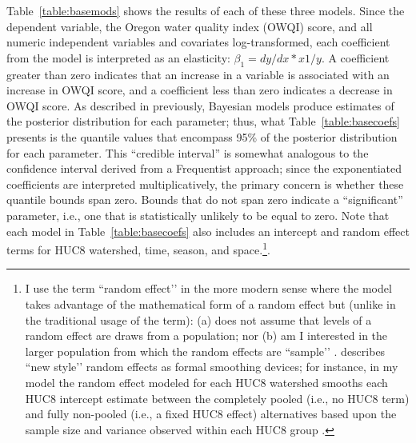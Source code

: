 \documentclass[12pt,a4paper,titlepage]{article}
\begin{document}
Table~\ref{table:basemods} shows the results of each of these three models. Since the dependent variable, the Oregon water quality index (OWQI) score, and all numeric independent variables and covariates log-transformed, each coefficient from the model is interpreted as an elasticity: $\beta_1 = dy/dx * x1/y$. A coefficient greater than zero indicates that an increase in a variable is associated with an increase in OWQI score, and a coefficient less than zero indicates a decrease in OWQI score. As described in previously, Bayesian models produce estimates of the posterior distribution for each parameter; thus, what Table~\ref{table:basecoefs} presents is the quantile values that encompass 95\% of the posterior distribution for each parameter. This “credible interval” \parencite{gelman2013} is somewhat analogous to the confidence interval derived from a Frequentist approach; since the exponentiated coefficients are interpreted multiplicatively, the primary concern is whether these quantile bounds span zero. Bounds that do not span zero indicate a “significant” parameter, i.e., one that is statistically unlikely to be equal to zero. Note that each model in Table~\ref{table:basecoefs} also includes an intercept and random effect terms for HUC8 watershed, time, season, and space.\footnote{I use the term ``random effect’’ in the more modern sense where the model takes advantage of the mathematical form of a random effect but (unlike in the traditional usage of the term): (a) does not assume that levels of a random effect are draws from a population; nor (b) am I interested in the larger population from which the random effects are ``sample’’ \parencite[see][]{hodges2014}. \textcite{hodges2014} describes ``new style’’ random effects as formal smoothing devices; for instance, in my model the random effect modeled for each HUC8 watershed smooths each HUC8 intercept estimate between the completely pooled (i.e., no HUC8 term) and fully non-pooled (i.e., a fixed HUC8 effect) alternatives based upon the sample size and variance observed within each HUC8 group \parencite[see][]{gelman2007}.}.


\end{document}
